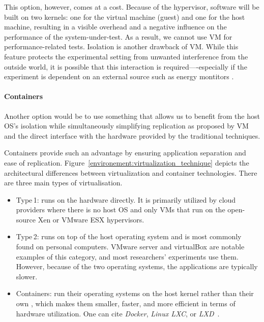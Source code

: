 This option, however, comes at a cost. Because of the hypervisor, software will be built on two kernels: one for the virtual machine (guest) and one for the host machine, resulting in a visible overhead and a negative influence on the performance of the system-under-test. As a result, we cannot use VM for performance-related tests. Isolation is another drawback of VM. While this feature protects the experimental setting from unwanted interference from the outside world, it is possible that this interaction is required—-especially if the experiment is dependent on an external source such as energy montitors .

\paragraph{Containers}
Another option would be to use something that allows us to benefit from the host OS's isolation while simultaneously simplifying replication as proposed by VM and the direct interface with the hardware provided by the traditional techniques.

Containers provide such an advantage by ensuring application separation and ease of replication.
Figure~\ref{environement:virtualization_technique} depicts the architectural differences between virtualization and container technologies. There are three main types of virtualisation.
\begin{itemize}
    \item \textsf{Type\,1}: runs on the hardware directly.
          It is primarily utilized by cloud providers where there is no host OS and only VMs that run on the open-source Xen or VMware ESX hypervisors.

    \item \textsf{Type\,2}: runs on top of the host operating system and is most commonly found on personal computers. VMware server and virtualBox are notable examples of this category, and most researchers' experiments use them.
          However, because of the two operating systems, the applications are typically slower.

    \item \textsf{Containers}: run their operating systems on the host kernel rather than their own , which makes them smaller, faster, and more efficient in terms of hardware utilization. One can cite \emph{Docker}, \emph{Linux LXC}, or \emph{LXD}~\cite{abuabdo_virtualization_2019}.
\end{itemize}


